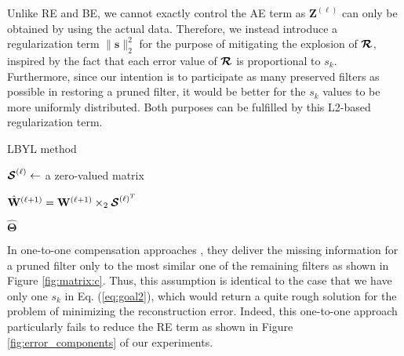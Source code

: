 Unlike RE and BE, we cannot exactly control the AE term as $\mathbf{Z}^{(\ell)}$ can only be obtained by using the actual data. Therefore, we instead introduce a regularization term $\|\mathbf{s}\|_{2}^{2}$ for the purpose of mitigating the explosion of $\boldsymbol{\R}$, inspired by the fact that each error value of $\boldsymbol{\R}$ is proportional to $s_k$. Furthermore, since our intention is to participate as many preserved filters as possible in restoring a pruned filter, it would be better for the $s_k$ values to be more uniformly distributed. Both purposes can be fulfilled by this L2-based regularization term. 

\begin{algorithm}[t]
  \small
  \caption{LBYL method}
  \label{alg:Recovery}
   
    {
    ${\boldsymbol{\S}}^{(\ell)} \leftarrow $ a zero-valued matrix
    
    $\hat{\mathbf{W}}^{(\ell+1)} = \mathbf{W}^{(\ell+1)} \times_2 \boldsymbol{\S}^{(\ell)^T} $
    }
\Return $\hat{\mathbf{\Theta}}$
\end{algorithm}




In one-to-one compensation approaches \cite{NM,Data-free}, they deliver the missing information for a pruned filter only to the most similar one of the remaining filters as shown in Figure \ref{fig:matrix:c}. Thus, this assumption is identical to the case that we have only one $s_{k}$ in Eq. (\ref{eq:goal2}), which would return a quite rough solution for the problem of minimizing the reconstruction error. Indeed, this one-to-one approach particularly fails to reduce the RE term as shown in Figure \ref{fig:error_components} of our experiments.

